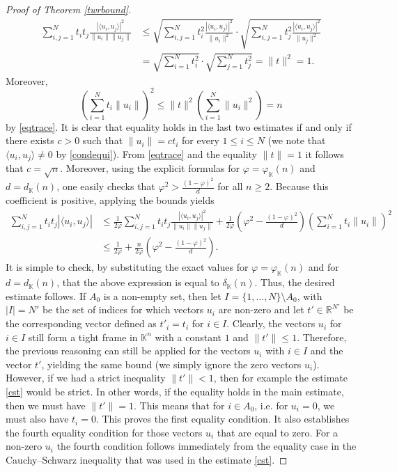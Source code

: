 \documentclass[12pt, reqno]{amsart}
\theoremstyle{definition}
\theoremstyle{remark}
\numberwithin{equation}{section}
\begin{document}
\begin{proof}[Proof of Theorem \ref{twrbound}]
\begin{align*}
\sum_{i, j=1}^{N} t_i t_j \frac{|\langle u_i, u_j \rangle|^2}{\|u_i\| \|u_j\|} &\leq \sqrt{\sum_{i, j=1}^{N} t^2_i \frac{|\langle u_i, u_j \rangle|^2}{\|u_i\|^2}} \cdot \sqrt{\sum_{i, j=1}^{N} t^2_j \frac{|\langle u_i, u_j \rangle|^2}{\|u_j\|^2}}\\
&=\sqrt{ \sum_{i=1}^{N} t_i^2} \cdot \sqrt{\sum_{j=1}^{N} t_j^2}=\|t\|^2=1.
\end{align*}
Moreover,
\begin{equation}
\label{cst}
\left( \sum_{i=1}^{N} t_i \|u_i\| \right)^2 \leq \|t\|^2 \left ( \sum_{i=1}^{N} \|u_i\|^2 \right ) = n
\end{equation}
by \eqref{eqtrace}. It is clear that equality holds in the last two estimates if and only if there exists $c>0$ such that $\|u_i\|=ct_i$ for every $1 \leq i \leq N$ (we note that $\langle u_i, u_j \rangle \neq 0$ by \eqref{condequi}). From \eqref{eqtrace} and the equality $\|t\|=1$ it follows that $c = \sqrt{n}$. Moreover, using the explicit formulas for $\varphi=\varphi_{\mathbb K}(n)$ and $d=d_{\mathbb K}(n)$, one easily checks that $\varphi^2 > \frac{(1-\varphi)^2}{d}$ for all $n \geq 2$. Because this coefficient is positive, applying the bounds yields
\begin{align*}
\sum_{i, j=1}^{N} t_i t_j |\langle u_i, u_j \rangle| &\leq \frac{1}{2\varphi} \sum_{i, j = 1}^{N} t_i t_j \frac{|\langle u_i, u_j \rangle|^2}{\|u_i\| \|u_j\|} + \frac{1}{2 \varphi} \left ( \varphi^2 - \frac{(1-\varphi)^2}{d} \right) \left ( \sum_{i=1}^{N} t_i \|u_i\| \right )^2\\
 &\leq \frac{1}{2 \varphi} + \frac{n}{2 \varphi} \left ( \varphi^2 - \frac{(1-\varphi)^2}{d} \right).
 \end{align*}
It is simple to check, by substituting the exact values for $\varphi=\varphi_{\mathbb{K}}(n)$ and for $d=d_{\mathbb{K}}(n)$, that the above expression is equal to $\delta_{\mathbb{K}}(n)$. Thus, the desired estimate follows. If $A_0$ is a non-empty set, then let $I = \{1, \ldots, N\} \setminus A_0$, with $|I|=N'$ be the set of indices for which vectors $u_i$ are non-zero and let $t' \in \mathbb{R}^{N'}$ be the corresponding vector defined as $t'_i=t_i$ for $i \in I$. Clearly, the vectors $u_i$ for $i \in I$ still form a tight frame in $\mathbb{K}^n$ with a constant $1$ and $\|t'\| \leq 1$. Therefore, the previous reasoning can still be applied for the vectors $u_i$ with $i \in I$ and the vector $t'$, yielding the same bound (we simply ignore the zero vectors $u_i$). However, if we had a strict inequality $\|t'\|<1$, then for example the estimate \eqref{cst} would be strict. In other words, if the equality holds in the main estimate, then we must have $\|t'\|=1$. This means that for $i \in A_0$, i.e. for $u_i=0$, we must also have $t_i=0$. This proves the first equality condition. It also establishes the fourth equality condition for those vectors $u_i$ that are equal to zero. For a non-zero $u_i$ the fourth condition follows immediately from the equality case in the Cauchy--Schwarz inequality that was used in the estimate \eqref{cst}. 


\end{proof}
\end{document}
